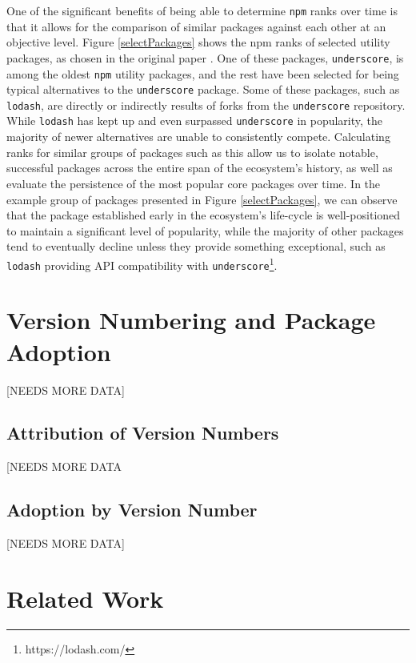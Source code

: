 \documentclass[10pt,conference]{IEEEtran}
\def\code#1{\texttt{#1}}
\begin{document}
One of the significant benefits of being able to determine
\code{npm} ranks over time is that it allows for the comparison
of similar packages against each other at an objective level.
Figure \ref{selectPackages} shows the npm ranks of selected 
utility packages, as chosen in the original paper \cite{Wittern:2016}.
One of these packages, \code{underscore}, is among the oldest \code{npm} 
utility packages, and the rest have been selected for being
typical alternatives to the \code{underscore} package. Some of these packages,
such as \code{lodash}, are directly or indirectly results of forks from the
\code{underscore} repository. While \code{lodash} has kept up and even surpassed
\code{underscore} in popularity, the majority of newer alternatives are unable
to consistently compete. Calculating ranks for similar groups of packages such as
this allow us to isolate notable, successful packages across the entire span of
the ecosystem's history, as well as evaluate the persistence of the most popular
core packages over time. In the example group of packages presented in Figure \ref{selectPackages},
we can observe that the package established early in the ecosystem's life-cycle
is well-positioned to maintain a significant level of popularity, while the majority of
other packages tend to eventually decline unless they provide something exceptional,
such as \code{lodash} providing API compatibility with \code{underscore}\footnote{https://lodash.com/}.



\section{Version Numbering and Package Adoption}
[NEEDS MORE DATA]

\subsection{Attribution of Version Numbers}
[NEEDS MORE DATA

\subsection{Adoption by Version Number}
[NEEDS MORE DATA]

\section{Related Work}
\end{document}
